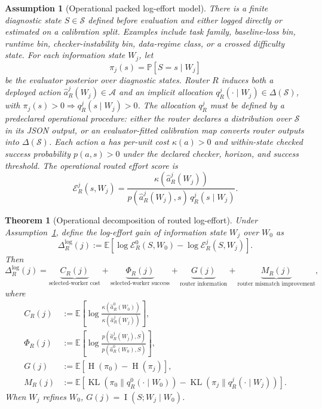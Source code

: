 \documentclass{article}
\newtheorem{assumption}{Assumption}
\newtheorem{theorem}{Theorem}
\DeclareMathOperator{\KL}{KL}
\DeclareMathOperator{\MI}{I}
\DeclareMathOperator{\Hent}{H}
\newcommand{\cA}{\mathcal{A}}
\newcommand{\cS}{\mathcal{S}}
\newcommand{\E}{\mathbb{E}}
\newcommand{\Prb}{\mathbb{P}}
\begin{document}
\begin{assumption}[Operational packed log-effort model]
\label{ass:router-packed}
There is a finite diagnostic state $S\in\cS$ defined before evaluation and either logged directly or estimated on a calibration split.
Examples include task family, baseline-loss bin, runtime bin, checker-instability bin, data-regime class, or a crossed difficulty state.
For each information state $W_j$, let
\[
\pi_j(s)=\Prb[S=s\mid W_j]
\]
be the evaluator posterior over diagnostic states.
Router $R$ induces both a deployed action $\hat a_R^j(W_j)\in\cA$ and an implicit allocation
$q_R^j(\cdot\mid W_j)\in\Delta(\cS)$, with
$\pi_j(s)>0\Rightarrow q_R^j(s\mid W_j)>0$.
The allocation $q_R^j$ must be defined by a predeclared operational procedure: either the router declares a distribution over $\cS$ in its JSON output, or an evaluator-fitted calibration map converts router outputs into $\Delta(\cS)$.
Each action $a$ has per-unit cost $\kappa(a)>0$ and within-state checked success probability $p(a,s)>0$ under the declared checker, horizon, and success threshold.
The operational routed effort score is
\[
\mathcal E_R^j(s,W_j)
=
\frac{\kappa(\hat a_R^j(W_j))}
{p(\hat a_R^j(W_j),s)\,q_R^j(s\mid W_j)}.
\]
\end{assumption}

\begin{theorem}[Operational decomposition of routed log-effort]
\label{thm:router-worker-decomp}
Under Assumption~\ref{ass:router-packed}, define the log-effort gain of information state $W_j$ over $W_0$ as
\[
\Delta_R^{\log}(j)
:=
\E\!\left[
\log \mathcal E_R^0(S,W_0)-\log \mathcal E_R^j(S,W_j)
\right].
\]
Then
\begin{equation}
\Delta_R^{\log}(j)
=
\underbrace{C_R(j)}_{\text{selected-worker cost}}
+
\underbrace{\Phi_R(j)}_{\text{selected-worker success}}
+
\underbrace{G(j)}_{\text{router information}}
+
\underbrace{M_R(j)}_{\text{router mismatch improvement}},
\label{eq:router-worker-decomp}
\end{equation}
where
\begin{align}
C_R(j)
&:=
\E\!\left[
\log\frac{\kappa(\hat a_R^0(W_0))}{\kappa(\hat a_R^j(W_j))}
\right],
\\
\Phi_R(j)
&:=
\E\!\left[
\log\frac{p(\hat a_R^j(W_j),S)}{p(\hat a_R^0(W_0),S)}
\right],
\\
G(j)
&:=
\E\!\left[\Hent(\pi_0)-\Hent(\pi_j)\right],
\\
M_R(j)
&:=
\E\!\left[
\KL(\pi_0\|q_R^0(\cdot\mid W_0))-\KL(\pi_j\|q_R^j(\cdot\mid W_j))
\right].
\end{align}
When $W_j$ refines $W_0$, $G(j)=\MI(S;W_j\mid W_0)$.
\end{theorem}
\end{document}
